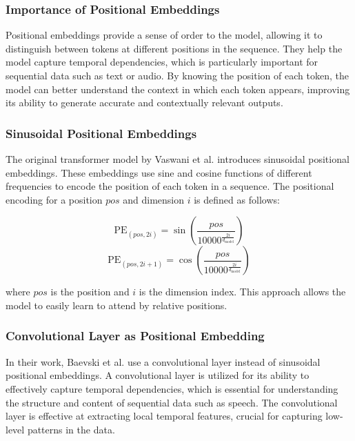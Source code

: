 \subsubsection{Importance of Positional Embeddings}

Positional embeddings provide a sense of order to the model, allowing it to distinguish between tokens at different positions in the sequence. They help the model capture temporal dependencies, which is particularly important for sequential data such as text or audio. By knowing the position of each token, the model can better understand the context in which each token appears, improving its ability to generate accurate and contextually relevant outputs.

\subsubsection{Sinusoidal Positional Embeddings}

The original transformer model by Vaswani et al. \cite{transformer} introduces sinusoidal positional embeddings. These embeddings use sine and cosine functions of different frequencies to encode the position of each token in a sequence. The positional encoding for a position $pos$ and dimension $i$ is defined as follows:

\begin{minipage}{\textwidth}
\begin{equation}
\text{PE}_{(pos, 2i)} = \sin\left(\frac{pos}{10000^{\frac{2i}{d_{\text{model}}}}}\right)
\end{equation}
\begin{equation}
\text{PE}_{(pos, 2i+1)} = \cos\left(\frac{pos}{10000^{\frac{2i}{d_{\text{model}}}}}\right)
\end{equation}
\end{minipage}

where $pos$ is the position and $i$ is the dimension index. This approach allows the model to easily learn to attend by relative positions.

\subsubsection{Convolutional Layer as Positional Embedding}

In their work, Baevski et al. \cite{baevski2020} use a convolutional layer instead of sinusoidal positional embeddings. A convolutional layer is utilized for its ability to effectively capture temporal dependencies, which is essential for understanding the structure and content of sequential data such as speech. The convolutional layer is effective at extracting local temporal features, crucial for capturing low-level patterns in the data.

